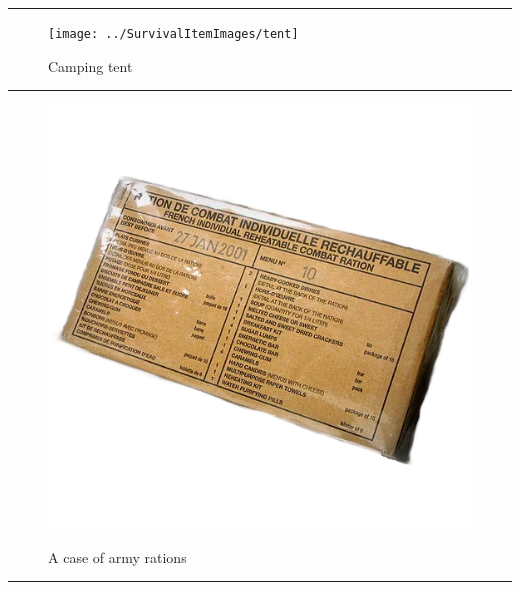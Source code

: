 \documentclass{article}
\begin{document}
    
        \par\noindent\rule{\textwidth}{0.4pt}
    \begin{figure}[H]
        \centering
        \begin{minipage}{0.25\textwidth}
            \centering
            \texttt{[image: ../SurvivalItemImages/tent]}
        \end{minipage}\hfill
        \begin{minipage}{0.7\textwidth}
            \centering
            \Large Camping tent
        \end{minipage}
    \end{figure}
    \vspace{-0.8em}
    \noindent\rule{\textwidth}{0.4pt}
            
    \begin{figure}[H]
        \centering
        \begin{minipage}{0.25\textwidth}
            \centering
            \includegraphics[width=\textwidth]{../SurvivalItemImages/rations}
        \end{minipage}\hfill
        \begin{minipage}{0.7\textwidth}
            \centering
            \Large A case of army rations
        \end{minipage}
    \end{figure}
    \vspace{-0.8em}
    \noindent\rule{\textwidth}{0.4pt}
            
\end{document}
